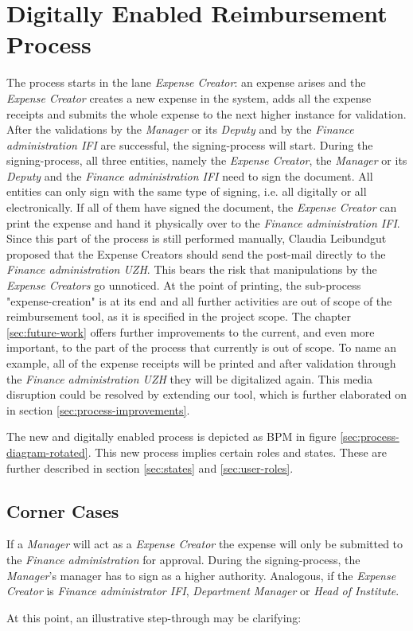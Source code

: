 \section{Digitally Enabled Reimbursement Process}
\label{sec:processflow}
The process starts in the lane \textit{Expense Creator}: an expense arises and the \textit{Expense Creator} creates a new expense in the system, adds all the expense receipts and submits the whole expense to the next higher instance for validation. After the validations by the \textit{Manager} or its \textit{Deputy} and by the \textit{Finance administration IFI} are successful, the signing-process will start.\newline
During the signing-process, all three entities, namely the \textit{Expense Creator}, the \textit{Manager} or its \textit{Deputy} and the \textit{Finance administration IFI} need to sign the document. All entities can only sign with the same type of signing, i.e. all digitally or all electronically. If all of them have signed the document, the \textit{Expense Creator} can print the expense and hand it physically over to the \textit{Finance administration IFI}.\newline
Since this part of the process is still performed manually, Claudia Leibundgut proposed that the Expense Creators should send the post-mail directly to the \textit{Finance administration UZH}. This bears the risk that manipulations by the \textit{Expense Creators} go unnoticed.\newline
At the point of printing, the sub-process "expense-creation" is at its end and all further activities are out of scope of the reimbursement tool, as it is specified in the project scope. The chapter \ref{sec:future-work} offers further improvements to the current, and even more important, to the part of the process that currently is out of scope. To name an example, all of the expense receipts will be printed and after validation through the \textit{Finance administration UZH} they will be digitalized again. This media disruption could be resolved by extending our tool, which is further elaborated on in section \ref{sec:process-improvements}.\par

The new and digitally enabled process is depicted as BPM\cite{bpmn} in figure \ref{sec:process-diagram-rotated}. This new process implies certain roles and states. These are further described in section \ref{sec:states} and \ref{sec:user-roles}.

\subsection{Corner Cases}
\label{sec:corner-cases}
If a \textit{Manager} will act as a \textit{Expense Creator} the expense will only be submitted to the \textit{Finance administration} for approval. During the signing-process, the \textit{Manager}'s manager has to sign as a higher authority. Analogous, if the \textit{Expense Creator} is \textit{Finance administrator IFI}, \textit{Department Manager} or \textit{Head of Institute}.\par 
At this point, an illustrative step-through may be clarifying:
	
